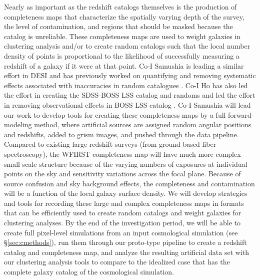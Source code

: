  Nearly as important as the redshift catalogs themselves is the production of
completeness maps that characterize the spatially varying depth of the survey,
the level of contamination, and regions that should be masked because the
catalog is unreliable.  These completeness maps are used to weight galaxies in
clustering analysis and/or to create random catalogs such that the local number
density of points is proportional to the likelihood of successfully measuring a
redshift of a galaxy if it were at that point.  Co-I Samushia is
leading a similar effort in DESI and has previously worked on quantifying and removing
systematic effects associated with inaccuracies in random catalogues
\cite{Samushia2012}.
Co-I Ho has also led the effort in creating the SDSS-BOSS LSS catalog and randoms \cite{Reid2015} and led the effort in removing observational effects in BOSS LSS catalog \cite{Ross2011}.
Co-I Samushia will lead our work to develop tools for creating these completeness maps
by a full forward-modeling method, where artificial sources are assigned random
angular positions and redshifts, added to grism images, and pushed through the
data pipeline.  Compared to existing large redshift surveys (from ground-based
fiber spectroscopy), the WFIRST completeness map will have much more complex
small scale structure because of the varying numbers of exposures at individual
points on the sky and sensitivity variations across the focal plane.  Because of
source confusion and sky background effects, the completeness and contamination
will be a function of the local galaxy surface density.  We will develop
strategies and tools for recording these large and complex completeness maps in
formats that can be efficiently used to create random catalogs and weight
galaxies for clustering analyses.  By the end of the investigation period, we
will be able to create full pixel-level simulations from an input cosmological
simulation (see \S\ref{sec:cmethods}), run them through our proto-type pipeline to create a
redshift catalog and completeness map, and analyze the resulting artificial data
set with our clustering analysis tools to compare to the idealized case that has
the complete galaxy catalog of the cosmological simulation.

